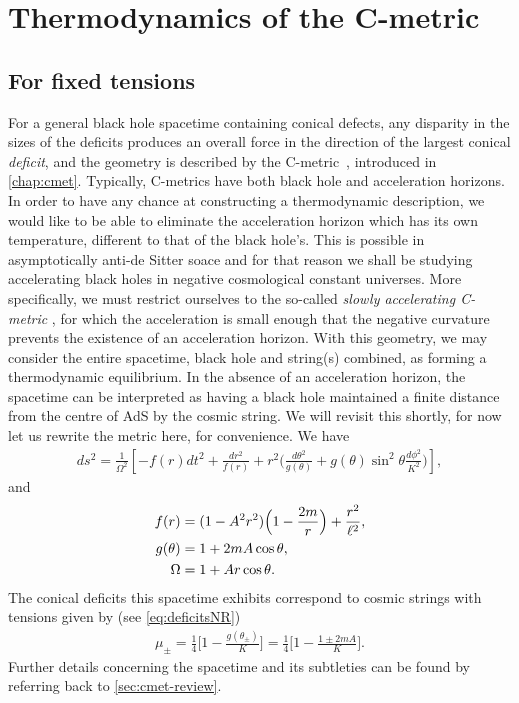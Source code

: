\documentclass[
twoside,
openright,
frontopenright,
]{dmathesis}
\newcommand{\nn}{\nonumber}
\begin{document}
\section{Thermodynamics of the C-metric}

\subsection{For fixed tensions}

For a general black hole spacetime containing conical defects, any disparity in
the sizes of the deficits produces an overall force in the direction of the
largest conical \emph{deficit}, and the geometry is described by the
C-metric~\cite{Kinnersley:1970zw}, introduced in \cref{chap:cmet}. Typically,
C-metrics have both black hole and acceleration horizons. In order to have any
chance at constructing a thermodynamic description, we would like to be able to
eliminate the acceleration horizon which has its own temperature, different to
that of the black hole's. This is possible in asymptotically anti-de Sitter
soace and for that reason we shall be studying accelerating black holes in
negative cosmological constant universes. More specifically, we must restrict
ourselves to the so-called \emph{slowly accelerating C-metric}
\cite{Podolsky:2002nk}, for which the acceleration is small enough that the
negative curvature prevents the existence of an acceleration horizon. With this
geometry, we may consider the entire spacetime, black hole and string(s)
combined, as forming a thermodynamic equilibrium. In the absence of an
acceleration horizon, the spacetime can be interpreted as having a black hole
maintained a finite distance from the centre of AdS by the cosmic string. We
will revisit this shortly, for now let us rewrite the metric here, for
convenience. We have
\begin{align}
  ds^2=\frac{1}{\Omega^2}\left[ -
  f(r) dt^2
  +\frac{dr^2}{f(r)} + r^2 \Big( \frac{d\theta^2}{g(\theta)} 
  + g(\theta)\sin^2\theta \frac{d\phi^2}{K^2}\Big)\right],
  \label{eq:cmetric3}
\end{align}
and
\begin{align}
f(r)&=(1-A^2r^2)\Bigl(1-\frac{2 m}{r}\Bigr)
+\frac{r^2}{\ell^2},\\
  g(\theta)&=1+2mA \cos\theta,\nn\\
  \Omega&=1+Ar\cos\theta.
\label{eq:cmetric3-fun}
\end{align}
The conical deficits this spacetime exhibits correspond to cosmic strings with
tensions given by (see \cref{eq:deficitsNR})
\begin{align}
  \label{eq:tensionsNR}
  \mu_\pm=\frac14\bigg[1-\frac{g(\theta_\pm)}{K}\bigg] = \frac14\bigg[1-\frac{1\pm
  2mA}{K}\bigg]. 
\end{align} 
Further details concerning the spacetime and its subtleties can be found by
referring back to \cref{sec:cmet-review}. 
\end{document}
